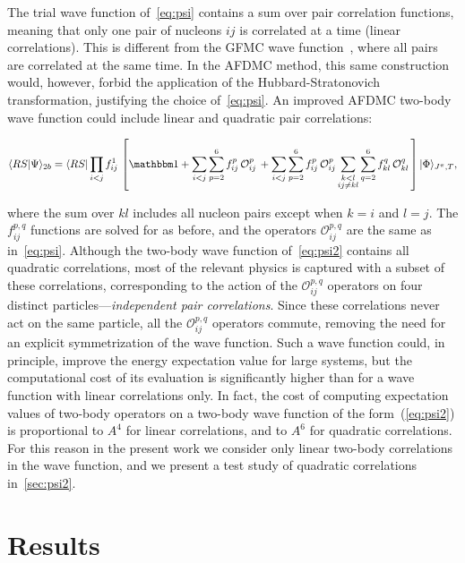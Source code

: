 \documentclass[aps,prc,twocolumn,superscriptaddress,floatfix]{revtex4-1}
\begin{document}
The trial wave function of~\cref{eq:psi} contains a sum over pair correlation functions, 
meaning that only one pair of nucleons $ij$ is correlated at a time (linear correlations).
This is different from the GFMC wave function~\cite{Carlson:2015}, 
where all pairs are correlated at the same time. 
In the AFDMC method, this same construction would, however, forbid the application of the 
Hubbard-Stratonovich transformation, justifying the choice of~\cref{eq:psi}. 
An improved AFDMC two-body wave function could include linear and
quadratic pair correlations: 
\begin{widetext}
\begin{align}
\langle RS|\Psi\rangle_{2b}=\langle RS|\prod_{i<j}f^1_{ij}\,
\left[\mathbbm1+\sum_{i<j}\sum_{p=2}^6 f^p_{ij}\,\mathcal O_{ij}^p\,
+\sum_{i<j}\sum_{p=2}^6 f^p_{ij}\,\mathcal O_{ij}^p \sum_{\substack{k<l\\ij\ne kl}}\sum_{q=2}^6 f^q_{kl}\,\mathcal O_{kl}^q\,\right]|\Phi\rangle_{J^\pi,T} ,
\label{eq:psi2}
\end{align}
\end{widetext}
where the sum over $kl$ includes all nucleon pairs except when $k=i$ and $l=j$. 
The $f^{p,q}_{ij}$ functions are solved for as before, and the operators 
$\mathcal{O}^{p,q}_{ij}$ are the same as in~\cref{eq:psi}. 
Although the two-body wave function of~\cref{eq:psi2} contains all quadratic correlations, 
most of the relevant physics is captured with a subset of these correlations, corresponding
to the action of the $\mathcal O_{ij}^{p,q}$ operators on four distinct 
particles---\emph{independent pair correlations}. Since these correlations never act on the same 
particle, all the $\mathcal{O}^{p,q}_{ij}$ operators commute, removing the need for an explicit 
symmetrization of the wave function. Such a wave function could, in principle, improve
the energy expectation value for large systems, but the computational cost of its evaluation is 
significantly higher than for a wave function with linear correlations only.
In fact, the cost of computing expectation values of two-body operators on
a two-body wave function of the form~(\ref{eq:psi2}) is proportional to $A^4$ for linear correlations, 
and to $A^6$ for quadratic correlations.
For this reason in the present work we consider only linear two-body correlations in the wave function, 
and we present a test study of quadratic correlations in~\cref{sec:psi2}. 


\section{Results}
\label{sec:res}
\end{document}
